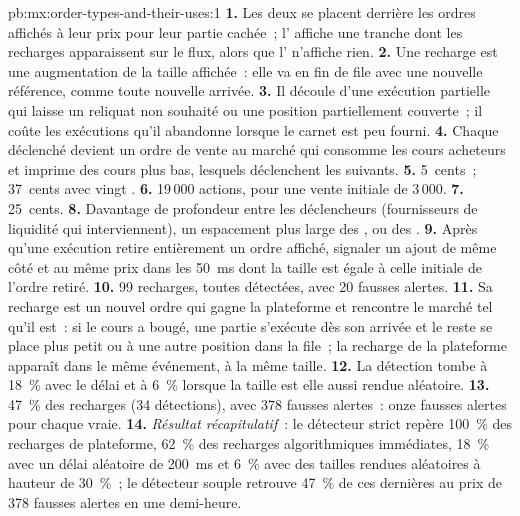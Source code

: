 \begin{solution}{pb:mx:order-types-and-their-uses:1}
\textbf{1.} Les deux se placent derrière les ordres affichés à leur prix pour leur partie cachée~; l' affiche une tranche dont les recharges apparaissent sur le flux, alors que
l' n'affiche rien.
\textbf{2.} Une recharge est une augmentation de la taille affichée~: elle va en fin de file avec une nouvelle référence, comme toute nouvelle arrivée.
\textbf{3.} Il découle d'une exécution partielle qui laisse un reliquat non souhaité ou une position partiellement couverte~; il coûte les exécutions qu'il abandonne lorsque le carnet est peu fourni.
\textbf{4.} Chaque  déclenché devient un ordre de vente au marché qui consomme les cours acheteurs et imprime des cours plus bas, lesquels déclenchent les  suivants.
\textbf{5.} 5~cents~; 37~cents avec vingt .
\textbf{6.} 19\,000 actions, pour une vente initiale de 3\,000.
\textbf{7.} 25~cents.
\textbf{8.} Davantage de profondeur entre les déclencheurs (fournisseurs de liquidité qui interviennent), un espacement plus large des , ou des .
\textbf{9.} Après qu'une exécution retire entièrement un ordre affiché, signaler un ajout de même côté et au même prix dans les 50~ms dont la taille est égale à celle
initiale de l'ordre retiré.
\textbf{10.} 99 recharges, toutes détectées, avec 20 fausses alertes.
\textbf{11.} Sa recharge est un nouvel ordre qui gagne la plateforme et rencontre le marché tel qu'il est~: si le cours a bougé, une partie s'exécute dès son arrivée
et le reste se place plus petit ou à une autre position dans la file~; la recharge de la plateforme apparaît dans le même événement, à la même taille.
\textbf{12.} La détection tombe à 18~\% avec le délai et à 6~\% lorsque la taille est elle aussi rendue aléatoire.
\textbf{13.} 47~\% des recharges (34 détections), avec 378 fausses alertes~: onze fausses alertes pour chaque vraie.
\textbf{14.} \emph{Résultat récapitulatif}~: le détecteur strict repère 100~\% des recharges de plateforme, 62~\% des recharges algorithmiques immédiates, 18~\% avec un délai aléatoire de 200~ms
et 6~\% avec des tailles rendues aléatoires à hauteur de 30~\%~; le détecteur souple retrouve 47~\% de ces dernières au prix de 378 fausses alertes en une demi-heure.

\end{solution}
